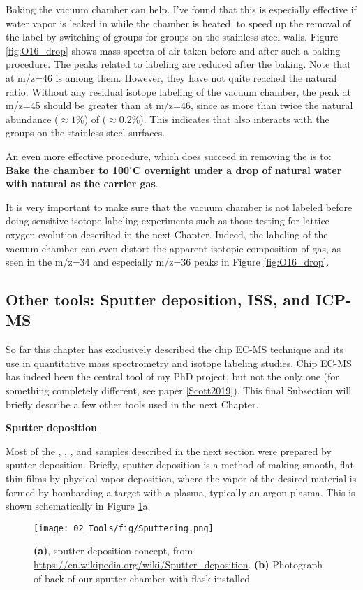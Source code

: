 Baking the vacuum chamber can help. I've found that this is especially effective if water vapor is leaked in while the chamber is heated, to speed up the removal of the  label by switching of  groups for  groups on the stainless steel walls. Figure \ref{fig:O16_drop} shows mass spectra of air taken before and after such a baking procedure. The peaks related to  labeling are reduced after the baking. Note that  at m/z=46 is among them. However, they have not quite reached the natural ratio. Without any residual isotope labeling of the vacuum chamber, the peak at m/z=45 should be greater than at m/z=46, since  as more than twice the natural abundance ($\approx 1$\%) of  ($\approx 0.2$\%). This indicates that  also interacts with the  groups on the stainless steel surfaces. 

An even more effective procedure, which does succeed in removing the  is to: \textbf{Bake the chamber to 100$^\circ$C overnight under a drop of natural water with natural  as the carrier gas}. 

It is very important to make sure that the vacuum chamber is not labeled before doing sensitive isotope labeling experiments such as those testing for lattice oxygen evolution described in the next Chapter. Indeed, the labeling of the vacuum chamber can even distort the apparent isotopic composition of  gas, as seen in the m/z=34 and especially m/z=36 peaks in Figure \ref{fig:O16_drop}.

\subsection{Other tools: Sputter deposition, ISS, and ICP-MS}\label{subsec:other_tools}

So far this chapter has exclusively described the chip EC-MS technique and its use in quantitative mass spectrometry and isotope labeling studies. Chip EC-MS has indeed been the central tool of my PhD project, but not the only one (for something completely different, see paper \ref{Scott2019}). This final Subsection will briefly describe a few other tools used in the next Chapter.

\textbf{Sputter deposition}

Most of the , , , and  samples described in the next section were prepared by sputter deposition. Briefly, sputter deposition is a method of making smooth, flat thin films by physical vapor deposition, where the vapor of the desired material is formed by bombarding a target with a plasma, typically an argon plasma. This is shown schematically in Figure \ref{fig:sputter}a. 
\begin{figure}[h!]
	\centering
	\texttt{[image: 02\_Tools/fig/Sputtering.png]}
	\caption{\textbf{(a)}, sputter deposition concept, from \url{https://en.wikipedia.org/wiki/Sputter_deposition}. \textbf{(b)} Photograph of back of our sputter chamber with  flask installed }
	\label{fig:sputter}
\end{figure}

